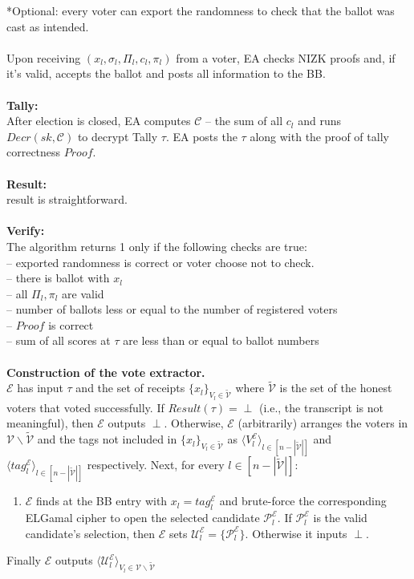 \documentclass[12pt]{article}
\begin{document}
*Optional: every voter can export the randomness to check that the ballot was cast as intended.\\\\
Upon receiving $(x_l, \sigma_l, \Pi_l, c_l, \pi_l)$ from a voter, EA checks NIZK proofs and, if it's valid, accepts the ballot and posts all information to the BB.\\\\
\textbf{Tally: }\\
After election is closed, EA computes $\mathcal{C}$ -- the sum of all $c_l$ and runs $Decr(sk, \mathcal{C})$ to decrypt Tally $\tau$. EA posts the $\tau$ along with the proof of tally correctness $Proof$.\\\\
\textbf{Result:} \\
result is straightforward.\\\\
\textbf{Verify:} \\
The algorithm returns 1 only if the following checks are true:\\
--  exported randomness is correct or voter choose not to check.\\
-- there is ballot with $x_l$\\
-- all $\Pi_l, \pi_l$ are valid\\
-- number of ballots less or equal to the number of registered voters\\
-- $Proof$ is correct\\
-- sum of all scores at $\tau$ are less than or equal to ballot numbers\\\\
\textbf{Construction of the vote extractor.}\\ 
$\mathcal{E}$ has input $\tau$ and the set of receipts  $\{x_l\}_{V_l \in \tilde{\mathcal{V}}}$ where $\tilde{\mathcal{V}}$ is the set of the honest voters that voted successfully.  If $Result(\tau) = \perp$ (i.e., the transcript is not meaningful), then $\mathcal{E}$ outputs $\perp$. Otherwise, $\mathcal{E}$ (arbitrarily) arranges the voters in $\mathcal{V} \backslash \tilde{\mathcal{V}}$ and the tags not included in $\{x_l\}_{V_l \in \tilde{\mathcal{V}}}$ as $\langle V_l^{\mathcal{E}} \rangle_{l \in  [n - |\tilde{\mathcal{V}}|]}$ and $\langle tag_l^{\mathcal{E}} \rangle_{l \in  [n - |\tilde{\mathcal{V}}|]}$ respectively. Next, for every $l \in [n - |\tilde{\mathcal{V}}|]$:\\
\begin{enumerate}
\item  $\mathcal{E}$ finds at the BB entry with   $x_l = tag_l^{\mathcal{E}}$ and brute-force the corresponding ELGamal cipher to open the selected candidate $\mathcal{P}_l^{\mathcal{E}}$. If $\mathcal{P}_l^{\mathcal{E}}$ is the valid candidate's selection, then $\mathcal{E}$ sets $\mathcal{U}_l^{\mathcal{E}} = \{\mathcal{P}_l^{\mathcal{E}}\}$. Otherwise it inputs $\perp$.
\end{enumerate}
Finally $\mathcal{E}$ outputs  $\langle \mathcal{U}_l^{\mathcal{E}} \rangle_{V_l \in \mathcal{V} \backslash \tilde{\mathcal{V}}  }$
\end{document}
